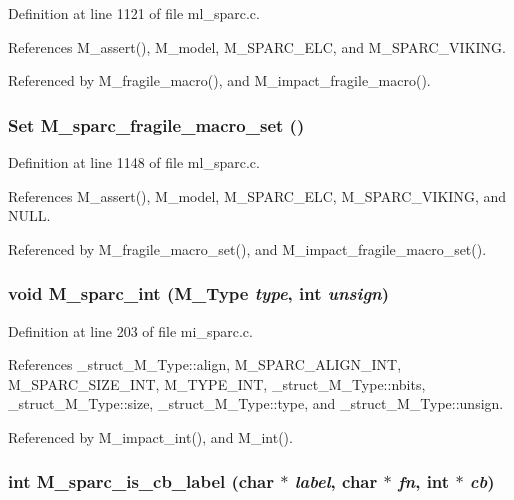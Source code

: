 Definition at line 1121 of file ml\_\-sparc.c.

References M\_\-assert(), M\_\-model, M\_\-SPARC\_\-ELC, and M\_\-SPARC\_\-VIKING.

Referenced by M\_\-fragile\_\-macro(), and M\_\-impact\_\-fragile\_\-macro().
\subsubsection{\setlength{\rightskip}{0pt plus 5cm}\bf{Set} M\_\-sparc\_\-fragile\_\-macro\_\-set ()}\label{m__sparc_8h_26a0ab8e51c36857e8dbb8349e3fa370}




Definition at line 1148 of file ml\_\-sparc.c.

References M\_\-assert(), M\_\-model, M\_\-SPARC\_\-ELC, M\_\-SPARC\_\-VIKING, and NULL.

Referenced by M\_\-fragile\_\-macro\_\-set(), and M\_\-impact\_\-fragile\_\-macro\_\-set().
\subsubsection{\setlength{\rightskip}{0pt plus 5cm}void M\_\-sparc\_\-int (\bf{M\_\-Type} {\em type}, int {\em unsign})}\label{m__sparc_8h_ee0c15c98a1c26b4e91cde2552b950e8}




Definition at line 203 of file mi\_\-sparc.c.

References \_\-struct\_\-M\_\-Type::align, M\_\-SPARC\_\-ALIGN\_\-INT, M\_\-SPARC\_\-SIZE\_\-INT, M\_\-TYPE\_\-INT, \_\-struct\_\-M\_\-Type::nbits, \_\-struct\_\-M\_\-Type::size, \_\-struct\_\-M\_\-Type::type, and \_\-struct\_\-M\_\-Type::unsign.

Referenced by M\_\-impact\_\-int(), and M\_\-int().
\subsubsection{\setlength{\rightskip}{0pt plus 5cm}int M\_\-sparc\_\-is\_\-cb\_\-label (char $\ast$ {\em label}, char $\ast$ {\em fn}, int $\ast$ {\em cb})}\label{m__sparc_8h_182aa66ec925aabc0d4718fe79941095}




